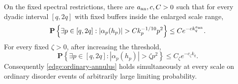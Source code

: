 \begin{lemma}\label{edge:path-annuli}
On the fixed spectral restrictions, there are \(a_{\rm an},c,C>0\)
such that for every dyadic interval \([q,2q]\) with fixed buffers
inside the enlarged scale range,
\begin{equation}\label{edge:shrinking-annulus}
 \mathbf P\left\{\exists p\in[q,2q]:
       |\alpha_p(h_p)|>Ck_p^{-1/10}p^2\right\}
       \le C e^{-c k_q^{a_{\rm an}}}.
\end{equation}
For every fixed \(\zeta>0\), after increasing the threshold,
\begin{equation}\label{edge:fixed-annulus-biased}
 \mathbf P\left\{\exists p\in[q,2q]:
       |\alpha_p(h_p)|>\zeta p^2\right\}
       \le C_\zeta e^{-c_\zeta k_q}.
\end{equation}
Consequently \eqref{edge:ordinary-annulus} holds simultaneously at
every scale on ordinary disorder events of arbitrarily large limiting
probability.
\end{lemma}

